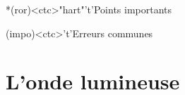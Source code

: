 \documentclass[../../main/main.tex]{subfiles}
\begin{document}
\begin{tcn}[sidebyside, fontupper=\small, fontlower=\small]
	\begin{tcn}*(ror)<ctc>"hart"'t'{Points importants}
	\end{tcn}
	\begin{tcn}(impo)<ctc>'t'{Erreurs communes}
	\end{tcn}
\end{tcn}


\section{L'onde lumineuse}
\end{document}
